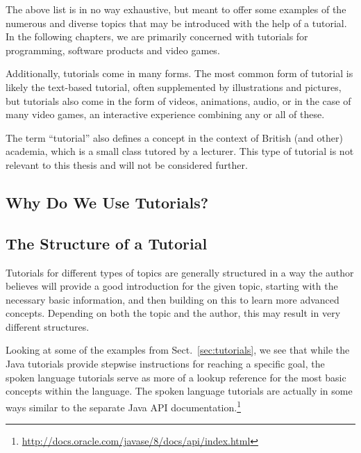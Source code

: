 \noindent
The above list is in no way exhaustive, but meant to offer some examples of the numerous and diverse topics that may be introduced with the help of a tutorial. In the following chapters, we are primarily concerned with tutorials for programming, software products and video games.

\noindent
Additionally, tutorials come in many forms. The most common form of tutorial is likely the text-based tutorial, often supplemented by illustrations and pictures, but tutorials also come in the form of videos, animations, audio, or in the case of many video games, an interactive experience combining any or all of these.

\noindent
The term ``tutorial'' also defines a concept in the context of British (and other) academia, which is a small class tutored by a lecturer. This type of tutorial is not relevant to this thesis and will not be considered further.

\subsection{Why Do We Use Tutorials?}
\label{sec:tutorial_why}

\subsection{The Structure of a Tutorial}
\label{sec:tutorial_structure}
Tutorials for different types of topics are generally structured in a way the author believes will provide a good introduction for the given topic, starting with the necessary basic information, and then building on this to learn more advanced concepts. Depending on both the topic and the author, this may result in very different structures.

\noindent
Looking at some of the examples from Sect.~\ref{sec:tutorials}, we see that while the Java tutorials provide stepwise instructions for reaching a specific goal, the spoken language tutorials serve as more of a lookup reference for the most basic concepts within the language. The spoken language tutorials are actually in some ways similar to the separate Java API documentation.\footnote{\url{http://docs.oracle.com/javase/8/docs/api/index.html}}

